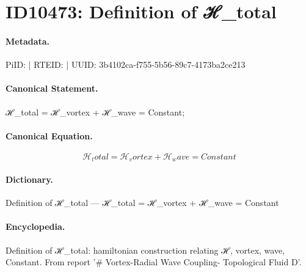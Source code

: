 \section*{ID10473: Definition of ℋ\_total}
\paragraph{Metadata.}
PiID:  | RTEID:  | UUID: 3b4102ca-f755-5b56-89c7-4173ba2ce213

\paragraph{Canonical Statement.}
ℋ\_total = ℋ\_vortex + ℋ\_wave = Constant;

\paragraph{Canonical Equation.}
\[
ℋ_total = ℋ_vortex + ℋ_wave = Constant
\]

\paragraph{Dictionary.}
Definition of ℋ\_total — ℋ\_total = ℋ\_vortex + ℋ\_wave = Constant

\paragraph{Encyclopedia.}
Definition of ℋ\_total: hamiltonian construction relating ℋ, vortex, wave, Constant. From report '\# Vortex-Radial Wave Coupling- Topological Fluid D'.
